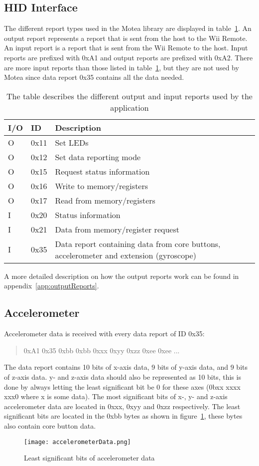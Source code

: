 \subsection{HID Interface}
The different report types used in the Motea library are displayed in table~\ref{tab:hidInterface}. An output report represents a report that is sent from the host to the Wii Remote. An input report is a report that is sent from the Wii Remote to the host. Input reports are prefixed with 0xA1 and output reports are prefixed with 0xA2. There are more input reports than those listed in table~\ref{tab:hidInterface}, but they are not used by Motea since data report 0x35 contains all the data needed. 

\begin{table}[h!]
\centering
\begin{tabularx}{\textwidth}{|l|l|X|}
\hline
I/O & ID & Description \\ \hline
O & 0x11 & Set LEDs \\ \hline
O & 0x12 & Set data reporting mode \\ \hline
O & 0x15 & Request status information \\ \hline
O & 0x16 & Write to memory/registers \\ \hline
O & 0x17 & Read from memory/registers \\ \hline
I & 0x20 & Status information \\ \hline
I & 0x21 & Data from memory/register request \\ \hline
I & 0x35 & Data report containing data from core buttons, accelerometer and extension (gyroscope) \\ \hline
\end{tabularx}
\caption{\footnotesize The table describes the different output and input reports used by the application}
\label{tab:hidInterface}
\end{table}

A more detailed description on how the output reports work can be found in appendix~\ref{app:outputReports}.

\subsection{Accelerometer}
Accelerometer data is received with every data report of ID 0x35:
\begin{quote}
0xA1 0x35 0xbb 0xbb 0xxx 0xyy 0xzz 0xee 0xee ...
\end{quote}
The data report contains 10 bits of x-axis data, 9 bits of y-axis data, and 9 bits of z-axis data. y- and z-axis data should also be represented as 10 bits, this is done by always letting the least significant bit be 0 for these axes (0bxx xxxx xxx0 where x is some data). The most significant bits of x-, y- and z-axis accelerometer data are located in 0xxx, 0xyy and 0xzz respectively. The least significant bits are located in the 0xbb bytes as shown in figure~\ref{fig:accelerometerData}, these bytes also contain core button data.
\begin{figure}[h!]
\texttt{[image: accelerometerData.png]}
\caption{\footnotesize Least significant bits of accelerometer data}
\label{fig:accelerometerData}
\end{figure}


